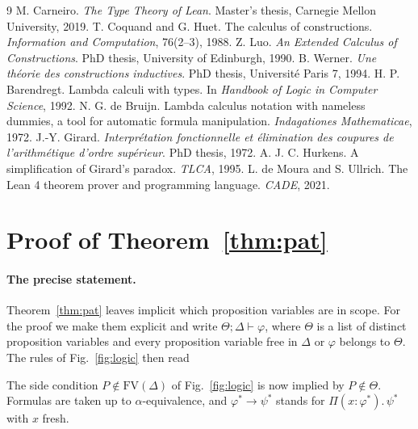 \documentclass[acmsmall,screen,nonacm]{acmart}
\newcommand{\tPi}[3]{\Pi(#1{:}#2).\,#3}
\newcommand{\subst}[3]{#1[#2 \mapsto #3]}
\newcommand{\FV}{\mathrm{FV}}
\begin{document}
\begin{thebibliography}{9}
 M. Carneiro. \emph{The Type Theory of Lean}. Master's thesis, Carnegie Mellon University, 2019.
 T. Coquand and G. Huet. The calculus of constructions. \emph{Information and Computation}, 76(2--3), 1988.
 Z. Luo. \emph{An Extended Calculus of Constructions}. PhD thesis, University of Edinburgh, 1990.
 B. Werner. \emph{Une théorie des constructions inductives}. PhD thesis, Université Paris 7, 1994.
 H. P. Barendregt. Lambda calculi with types. In \emph{Handbook of Logic in Computer Science}, 1992.
 N. G. de Bruijn. Lambda calculus notation with nameless dummies, a tool for automatic formula manipulation. \emph{Indagationes Mathematicae}, 1972.
 J.-Y. Girard. \emph{Interprétation fonctionnelle et élimination des coupures de l'arithmétique d'ordre supérieur}. PhD thesis, 1972.
 A. J. C. Hurkens. A simplification of Girard's paradox. \emph{TLCA}, 1995.
 L. de Moura and S. Ullrich. The Lean 4 theorem prover and programming language. \emph{CADE}, 2021.
\end{thebibliography}

\appendix

\section{Proof of Theorem~\ref{thm:pat}}
\label{app:pat}

\paragraph{The precise statement.}
Theorem~\ref{thm:pat} leaves implicit which proposition variables are in scope.
For the proof we make them explicit and write $\Theta; \Delta \vdash \varphi$, where $\Theta$ is a list of distinct proposition variables
and every proposition variable free in $\Delta$ or $\varphi$ belongs to $\Theta$.
The rules of Fig.~\ref{fig:logic} then read
The side condition $P \notin \FV(\Delta)$ of Fig.~\ref{fig:logic} is now implied by $P \notin \Theta$.
Formulas are taken up to $\alpha$-equivalence, and $\varphi^\ast \to \psi^\ast$ stands for $\tPi{x}{\varphi^\ast}{\psi^\ast}$ with $x$ fresh.
\end{document}
